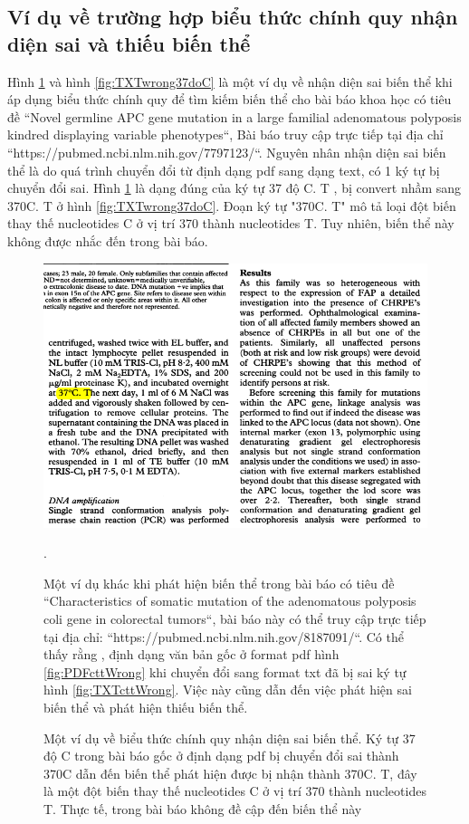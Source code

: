 \documentclass[../DoAn.tex]{subfiles}
\begin{document}
\subsection{Ví dụ về trường hợp biểu thức chính quy nhận diện sai và thiếu biến thể}
Hình \ref{fig:PDFwrong37doC} và hình  \ref{fig:TXTwrong37doC} là một ví dụ về nhận diện sai biến thể khi áp dụng biểu thức chính quy để tìm kiếm biến thể cho bài báo khoa học có tiêu đề ``Novel germline APC gene mutation in a large familial adenomatous polyposis kindred displaying variable phenotypes``, Bài báo truy cập trực tiếp tại địa chỉ ``https://pubmed.ncbi.nlm.nih.gov/7797123/``. Nguyên nhân nhận diện sai biến thể là do quá trình chuyển đổi từ định dạng pdf sang dạng text, có 1 ký tự bị chuyển đổi sai. Hình \ref{fig:PDFwrong37doC} là dạng đúng của ký tự 37 độ C. T , bị convert nhầm sang 370C. T ở hình \ref{fig:TXTwrong37doC}. Đoạn ký tự "370C. T" mô tả loại đột biến thay thế nucleotides C ở vị trí 370 thành nucleotides T. Tuy nhiên, biến thể này không được nhắc đến trong bài báo. 

\begin{figure}
\centering
\includegraphics[width=1.0\linewidth]{Hinh_ve/PDFwrong37doC.png}
\caption{Một ví dụ về biểu thức chính quy nhận diện sai biến thể. Ký tự 37 độ C trong bài báo gốc ở định dạng pdf bị chuyển đổi sai thành 370C dẫn đến biến thể phát hiện được bị nhận thành 370C. T, đây là một đột biến thay thế nucleotides C ở vị trí 370 thành nucleotides T. Thực tế, trong bài báo không đề cập đến biến thể này}. 

Một ví dụ khác khi phát hiện biến thể trong bài báo có tiêu đề ``Characteristics of somatic mutation of the adenomatous polyposis coli gene in colorectal tumors``, bài báo này có thể truy cập trực tiếp tại địa chỉ: ``https://pubmed.ncbi.nlm.nih.gov/8187091/``. Có thể thấy rằng , định dạng văn bản gốc ở format pdf hình \ref{fig:PDFcttWrong} khi chuyển đổi sang format txt đã bị sai ký tự hình \ref{fig:TXTcttWrong}. Việc này cũng dẫn đến việc phát hiện sai biến thể và phát hiện thiếu biến thể.
\label{fig:PDFwrong37doC}
\end{figure}
\end{document}
